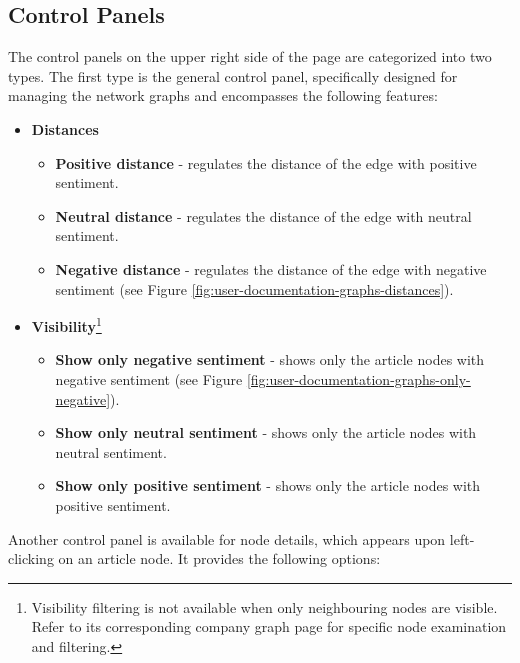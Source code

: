 \subsection{Control Panels}
\label{subsec:control-panel}
The control panels on the upper right side of the page are categorized into two types. The first type is the general control panel, specifically designed for managing the network graphs and encompasses the following features:
\begin{itemize}
    \item \textbf{Distances}
    \begin{itemize}
        \item \textbf{Positive distance} - regulates the distance of the edge with positive sentiment.
        \item \textbf{Neutral distance} - regulates the distance of the edge with neutral sentiment.
        \item \textbf{Negative distance} - regulates the distance of the edge with negative sentiment (see Figure \ref{fig:user-documentation-graphs-distances}). 
    \end{itemize}
    \item \textbf{Visibility}\footnote{Visibility filtering is not available when only neighbouring nodes are visible. Refer to its corresponding company graph page for specific node examination and filtering.}
    \begin{itemize}
        \item \textbf{Show only negative sentiment} - shows only the article nodes with negative sentiment (see Figure \ref{fig:user-documentation-graphs-only-negative}).
        \item \textbf{Show only neutral sentiment} - shows only the article nodes with neutral sentiment.
        \item \textbf{Show only positive sentiment} - shows only the article nodes with positive sentiment.
    \end{itemize}
\end{itemize}

Another control panel is available for node details, which appears upon left-clicking on an article node. It provides the following options:

